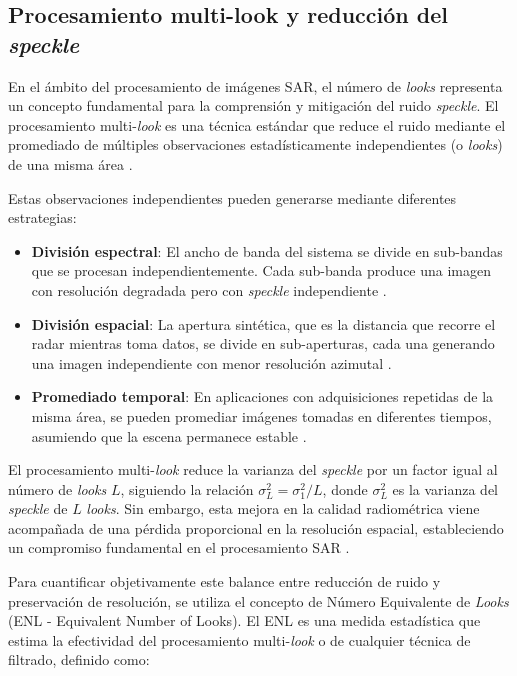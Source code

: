 \subsection{Procesamiento multi-look y reducción del \emph{speckle}}

En el ámbito del procesamiento de imágenes SAR, el número de \emph{looks} representa un concepto fundamental para la comprensión y mitigación del ruido \emph{speckle}. El procesamiento multi-\emph{look} es una técnica estándar que reduce el ruido mediante el promediado de múltiples observaciones estadísticamente independientes (o \emph{looks}) de una misma área \cite{porcello1976speckle}. 

Estas observaciones independientes pueden generarse mediante diferentes estrategias:

\begin{itemize}
	\item \textbf{División espectral}: El ancho de banda del sistema se divide en sub-bandas que se procesan independientemente. Cada sub-banda produce una imagen con resolución degradada pero con \emph{speckle} independiente \cite{brusch2011ship}.
	
	\item \textbf{División espacial}: La apertura sintética, que es la distancia que recorre el radar mientras toma datos, se divide en sub-aperturas, cada una generando una imagen independiente con menor resolución azimutal \cite{fattahi2017insar}.
	
	\item \textbf{Promediado temporal}: En aplicaciones con adquisiciones repetidas de la misma área, se pueden promediar imágenes tomadas en diferentes tiempos, asumiendo que la escena permanece estable \cite{quegan2001filtering}.
\end{itemize}

El procesamiento multi-\emph{look} reduce la varianza del \emph{speckle} por un factor igual al número de \emph{looks} $L$, siguiendo la relación $\sigma_L^2 = \sigma_1^2\big/L$, donde $\sigma_L^2$ es la varianza del \emph{speckle} de $L$ \emph{looks}. Sin embargo, esta mejora en la calidad radiométrica viene acompañada de una pérdida proporcional en la resolución espacial, estableciendo un compromiso fundamental en el procesamiento SAR \cite{lopez1990adaptive}.

Para cuantificar objetivamente este balance entre reducción de ruido y preservación de resolución, se utiliza el concepto de Número Equivalente de \emph{Looks} (ENL - Equivalent Number of Looks). El ENL es una medida estadística que estima la efectividad del procesamiento multi-\emph{look} o de cualquier técnica de filtrado, definido como:

